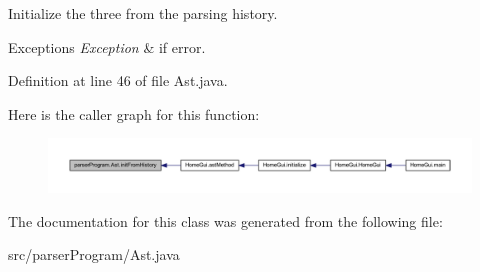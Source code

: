 Initialize the three from the parsing history. 


\begin{DoxyExceptions}{Exceptions}
{\em Exception} & if error. \\
\hline
\end{DoxyExceptions}


Definition at line 46 of file Ast.\-java.



Here is the caller graph for this function\-:
\nopagebreak
\begin{figure}[H]
\begin{center}
\leavevmode
\includegraphics[width=350pt]{classparser_program_1_1_ast_a9ad5f3d77935440489df31131b18bf8e_icgraph}
\end{center}
\end{figure}




The documentation for this class was generated from the following file\-:\begin{DoxyCompactItemize}
\item 
src/parser\-Program/Ast.\-java\end{DoxyCompactItemize}
